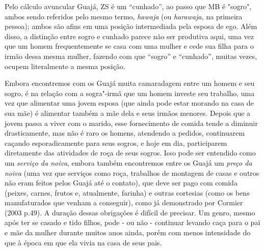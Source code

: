Pelo cálculo avuncular Guajá, ZS é um ``cunhado'', ao passo que MB é
"sogro", ambos sendo referidos pelo mesmo termo, \emph{hawaja} (ou
\emph{harawaja,} na primeira pessoa); ambos são afins em uma posição
intermediada pela esposa de ego. Além disso, a distinção entre sogro e
cunhado parece não ser produtiva aqui, uma vez que um homem
frequentemente se casa com uma mulher e cede sua filha para o irmão
dessa mesma mulher, fazendo com que ``sogro'' e ``cunhado'', muitas vezes,
ocupem literalmente a mesma posição.

Embora encontremos com os Guajá muita camaradagem entre um homem e seu
sogro, é na relação com a sogra"-irmã que um homem investe seu trabalho,
uma vez que alimentar uma jovem esposa (que ainda pode estar morando na
casa de sua mãe) é alimentar também a mãe dela e seus irmãos menores.
Depois que a jovem passa a viver com o marido, esse fornecimento de
comida tende a diminuir drasticamente, mas não é raro os homens,
atendendo a pedidos, continuarem caçando esporadicamente para seus
sogros, e hoje em dia, participarem diretamente das atividades de roça
de seus sogros. Isso pode ser entendido como um \emph{serviço da noiva},
embora também encontremos entre os Guajá um \emph{preço da noiva} (uma
vez que serviços como roça, trabalhos de montagem de casas e outros não
eram feitos pelos Guajá até o contato), que deve ser pago com comida
(peixes, carnes, frutos e, atualmente, farinha) e outras cortesias (como
os bens manufaturados que venham a conseguir), como já demonstrado por
Cormier (2003 p.49). A duração dessas obrigações é difícil de precisar.
Um genro, mesmo após ter se casado e tido filhos, pode - ou não -
continuar levando caça para o pai e mãe da mulher durante muitos anos
ainda, porém com menos intensidade do que à época em que ela vivia na
casa de seus pais.

